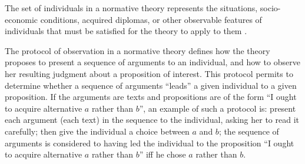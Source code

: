\documentclass[version=last, pagesize, twoside=off, bibliography=totoc, DIV=calc, fontsize=12pt, a4paper, french, english]{scrartcl}
\begin{document}
The set of individuals in a normative theory represents the situations, socio-economic conditions, acquired diplomas, or other observable features of individuals that must be satisfied for the theory to apply to them .

The protocol of observation in a normative theory defines how the theory proposes to present a sequence 
of arguments to an individual, and how to observe her resulting judgment about a proposition of interest. This protocol permits to determine whether a sequence of arguments “leads” a given individual to a given proposition. If the arguments are texts and propositions are of the form “I ought to acquire alternative $a$ rather than $b$”, an example of such a protocol is: present each argument (each text) in the sequence to the individual, asking her to read it carefully; then give the individual a choice between $a$ and $b$; the sequence of arguments is considered to having led the individual to the proposition “I ought to acquire alternative $a$ rather than $b$” iff he chose $a$ rather than $b$.
\end{document}
